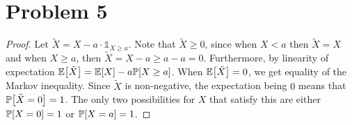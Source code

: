 \documentclass{eeleyes}
\begin{document}
\section*{Problem 5}
\begin{proof}
    Let $\tilde{X} = X - a \cdot \mathbb{1}_{X \geq a}$. Note that $\tilde{X} \geq 0$, since when $X < a$ then $\tilde{X} = X$ and when $X \geq a$, then $\tilde{X} = X - a \geq a - a = 0$. Furthermore, by linearity of expectation $\mathbb{E}\qty[\tilde{X}] = \mathbb{E}\qty[X] - a \mathbb{P}\qty[X \geq a]$. When $\mathbb{E}\qty[\tilde{X}] = 0$, we get equality of the Markov inequality. Since $\tilde{X}$ is non-negative, the expectation being $0$ means that $\mathbb{P}\qty[\tilde{X} = 0] = 1$. The only two possibilities for $X$ that satisfy this are either $\mathbb{P}\qty[X = 0] = 1$ or $\mathbb{P}\qty[X = a] = 1$.
\end{proof}
\end{document}
